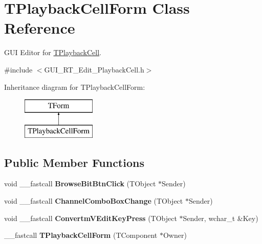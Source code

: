 \hypertarget{class_t_playback_cell_form}{\section{T\+Playback\+Cell\+Form Class Reference}
\label{class_t_playback_cell_form}
}


G\+U\+I Editor for \hyperlink{class_t_playback_cell}{T\+Playback\+Cell}.  




{\ttfamily \#include $<$G\+U\+I\+\_\+\+R\+T\+\_\+\+Edit\+\_\+\+Playback\+Cell.\+h$>$}

Inheritance diagram for T\+Playback\+Cell\+Form\+:\begin{figure}[H]
\begin{center}
\leavevmode
\includegraphics[height=2.000000cm]{class_t_playback_cell_form}
\end{center}
\end{figure}
\subsection*{Public Member Functions}
\begin{DoxyCompactItemize}
\item 
\hypertarget{class_t_playback_cell_form_a9ddd7c0eb2f14078fbe9227245162630}{void \+\_\+\+\_\+fastcall {\bfseries Browse\+Bit\+Btn\+Click} (T\+Object $\ast$Sender)}\label{class_t_playback_cell_form_a9ddd7c0eb2f14078fbe9227245162630}

\item 
\hypertarget{class_t_playback_cell_form_a31241fdb5b23e233cff3f60d7f9e2bd8}{void \+\_\+\+\_\+fastcall {\bfseries Channel\+Combo\+Box\+Change} (T\+Object $\ast$Sender)}\label{class_t_playback_cell_form_a31241fdb5b23e233cff3f60d7f9e2bd8}

\item 
\hypertarget{class_t_playback_cell_form_a5cbf97d59d4b022a81cbcb23515cdc8f}{void \+\_\+\+\_\+fastcall {\bfseries Convertm\+V\+Edit\+Key\+Press} (T\+Object $\ast$Sender, wchar\+\_\+t \&Key)}\label{class_t_playback_cell_form_a5cbf97d59d4b022a81cbcb23515cdc8f}

\item 
\hypertarget{class_t_playback_cell_form_a7c7022532ad563f28b1791804a2f189f}{\+\_\+\+\_\+fastcall {\bfseries T\+Playback\+Cell\+Form} (T\+Component $\ast$Owner)}\label{class_t_playback_cell_form_a7c7022532ad563f28b1791804a2f189f}

\end{DoxyCompactItemize}
